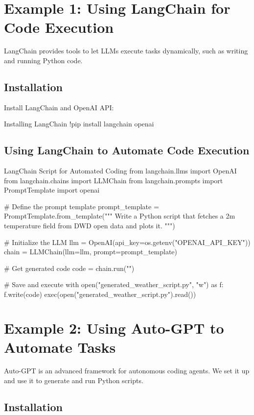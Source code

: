 \section{Example 1: Using LangChain for Code Execution}
LangChain provides tools to let LLMs execute tasks dynamically, such as writing and running Python code.

\subsection{Installation}
Install LangChain and OpenAI API:

\begin{codeonly}{Installing LangChain}
!pip install langchain openai
\end{codeonly}

\subsection{Using LangChain to Automate Code Execution}

\begin{codeonly}{LangChain Script for Automated Coding}
from langchain.llms import OpenAI
from langchain.chains import LLMChain
from langchain.prompts import PromptTemplate
import openai

# Define the prompt template
prompt_template = PromptTemplate.from_template("""
Write a Python script that fetches a 2m temperature field from DWD open data and plots it.
""")

# Initialize the LLM
llm = OpenAI(api_key=os.getenv("OPENAI_API_KEY"))
chain = LLMChain(llm=llm, prompt=prompt_template)

# Get generated code
code = chain.run("")

# Save and execute
with open("generated_weather_script.py", "w") as f:
    f.write(code)
exec(open("generated_weather_script.py").read())
\end{codeonly}

\section{Example 2: Using Auto-GPT to Automate Tasks}
Auto-GPT is an advanced framework for autonomous coding agents. We set it up and use it to generate and run Python scripts.

\subsection{Installation}

